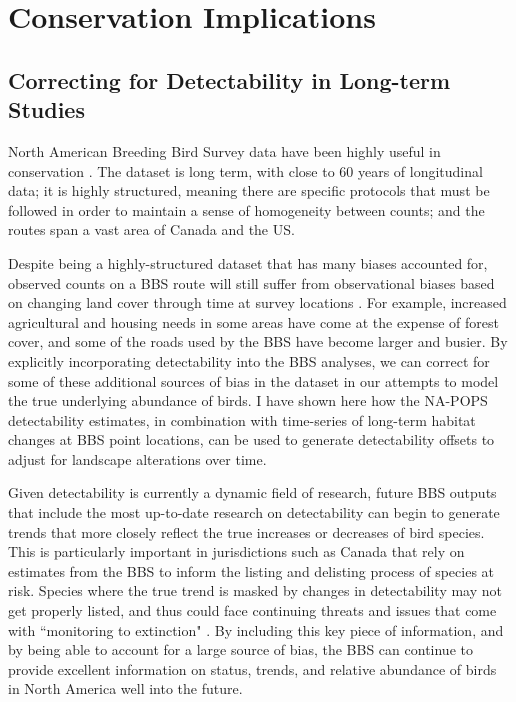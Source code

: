 \section{Conservation Implications}

\subsection{Correcting for Detectability in Long-term Studies}

\par North American Breeding Bird Survey data have been highly useful in conservation \citep{hudson_role_2017}.
The dataset is long term, with close to 60 years of longitudinal data; it is highly structured, meaning there are specific protocols that must be followed in order to maintain a sense of homogeneity between counts; and the routes span a vast area of Canada and the US.

\par Despite being a highly-structured dataset that has many biases accounted for, observed counts on a BBS route will still suffer from observational biases based on changing land cover through time at survey locations \citep{sauer_first_2017}.
For example, increased agricultural and housing needs in some areas have come at the expense of forest cover, and some of the roads used by the BBS have become larger and busier. 
By explicitly incorporating detectability into the BBS analyses, we can correct for some of these additional sources of bias in the dataset in our attempts to model the true underlying abundance of birds.
I have shown here how the NA-POPS detectability estimates, in combination with time-series of long-term habitat changes at BBS point locations, can be used to generate detectability offsets to adjust for landscape alterations over time. 

\par Given detectability is currently a dynamic field of research, future BBS outputs that include the most up-to-date research on detectability can begin to generate trends that more closely reflect the true increases or decreases of bird species.
This is particularly important in jurisdictions such as Canada that rely on estimates from the BBS to inform the listing and delisting process of species at risk.
Species where the true trend is masked by changes in detectability may not get properly listed, and thus could face continuing threats and issues that come with ``monitoring to extinction" \citep{martin_acting_2012, lindenmayer_counting_2013}.
By including this key piece of information, and by being able to account for a large source of bias, the BBS can continue to provide excellent information on status, trends, and relative abundance of birds in North America well into the future.

